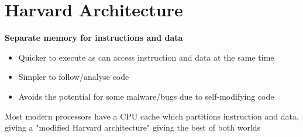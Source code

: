 \documentclass{article}[18pt]
\begin{document}
\section{Harvard Architecture}
\textbf{Separate memory for instructions and data}\\
\begin{itemize}
\item Quicker to execute as can access instruction and data at the same time
\item Simpler to follow/analyse code
\item Avoids the potential for some malware/bugs due to self-modifying code
\end{itemize}
Most modern processors have a CPU cache which partitions instruction and data, giving a "modified Harvard architecture" giving the best of both worlds
\end{document}
